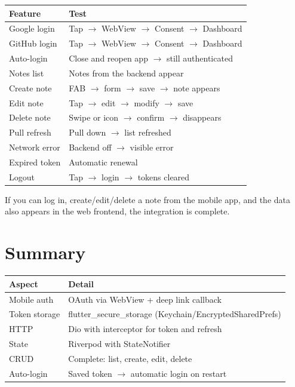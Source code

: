 \begin{center}
\begin{tabularx}{\textwidth}{l X}
\toprule
\textbf{Feature} & \textbf{Test} \\
\midrule
Google login & Tap $\rightarrow$ WebView $\rightarrow$ Consent $\rightarrow$ Dashboard \\
GitHub login & Tap $\rightarrow$ WebView $\rightarrow$ Consent $\rightarrow$ Dashboard \\
Auto-login & Close and reopen app $\rightarrow$ still authenticated \\
Notes list & Notes from the backend appear \\
Create note & FAB $\rightarrow$ form $\rightarrow$ save $\rightarrow$ note appears \\
Edit note & Tap $\rightarrow$ edit $\rightarrow$ modify $\rightarrow$ save \\
Delete note & Swipe or icon $\rightarrow$ confirm $\rightarrow$ disappears \\
Pull refresh & Pull down $\rightarrow$ list refreshed \\
Network error & Backend off $\rightarrow$ visible error \\
Expired token & Automatic renewal \\
Logout & Tap $\rightarrow$ login $\rightarrow$ tokens cleared \\
\bottomrule
\end{tabularx}
\end{center}

\begin{checkpointbox}
If you can log in, create/edit/delete a note from the mobile app, and the data also appears in the web frontend, the integration is complete.
\end{checkpointbox}

\section*{Summary}

\begin{center}
\begin{tabularx}{\textwidth}{l X}
\toprule
\textbf{Aspect} & \textbf{Detail} \\
\midrule
Mobile auth & OAuth via WebView + deep link callback \\
Token storage & flutter\_secure\_storage (Keychain/EncryptedSharedPrefs) \\
HTTP & Dio with interceptor for token and refresh \\
State & Riverpod with StateNotifier \\
CRUD & Complete: list, create, edit, delete \\
Auto-login & Saved token $\rightarrow$ automatic login on restart \\
\bottomrule
\end{tabularx}
\end{center}
